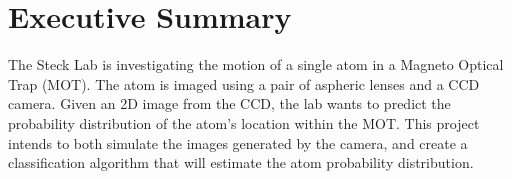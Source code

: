 \section*{Executive Summary}

The Steck Lab is investigating the motion of a single atom in a Magneto Optical Trap (MOT).  The atom is imaged using a pair of aspheric lenses and a CCD camera.  Given an 2D image from the CCD, the lab wants to predict the probability distribution of the atom's location within the MOT. This project intends to both simulate the images generated by the camera, and create a classification algorithm that will estimate the atom probability distribution.




